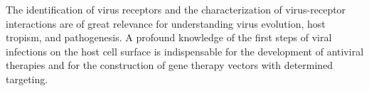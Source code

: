 The identification of virus receptors and the characterization of virus-receptor interactions are of great relevance for understanding virus evolution, host tropism, and pathogenesis. A profound knowledge of the first steps of viral infections on the host cell surface is indispensable for the development of antiviral therapies and for the construction of gene therapy vectors with determined targeting.    



